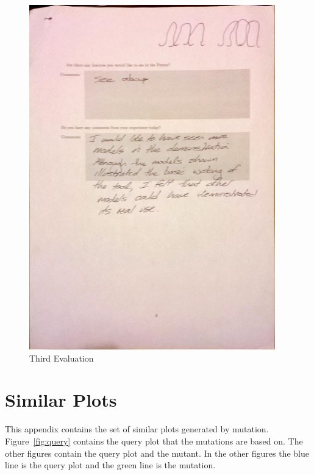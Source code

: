 \begin{figure}[h!]
    \centering
    \includegraphics[width=0.95\textwidth]{images/user_eval/user_eval_23.jpg}
    \caption{Third Evaluation}
\end{figure}

\clearpage

\section{Similar Plots}
\label{sec:mutants}

This appendix contains the set of similar plots generated by mutation.  Figure~\ref{fig:query} contains the query plot that the mutations are based on.  The other figures contain the query plot and the mutant.  In the other figures the blue line is the query plot and the green line is the mutation.

